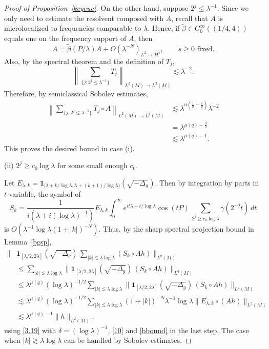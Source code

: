 \documentclass[11pt]{amsart}
\newcommand{\la}{\lambda}
\begin{document}
\begin{proof}[Proof of Proposition~\ref{keyeuc}]
On the other hand, suppose $2^j\leq\la^{-1}$. Since we only need
to estimate the resolvent composed with $A$, recall that $A$ is
microlocalized to frequencies comparable to $\la$. Hence, if
$\tilde\beta\in C_0^\infty((1/4,4))$ equals one on the frequency
support of $A$, then
\[
A=\tilde\beta(P/\la)A+O(\la^{-N})_{L^2\to H^s},\qquad s\geq0\text{ fixed}.
\]
Also, by the spectral theorem and the definition of $T_j$,
\[
\left\|
\sum_{\{j:2^j\leq\la^{-1}\}}T_j
\right\|_{L^2(M)\to L^2(M)}
\lesssim
\la^{-2}.
\]
Therefore, by semiclassical Sobolev estimates,
\begin{align*}
\left\|
\sum_{\{j:2^j\leq\la^{-1}\}}T_j\circ A
\right\|_{L^2(M)\to L^q(M)}
&\lesssim
\la^{n(\frac12-\frac1q)}
\la^{-2}
\\
&=
\la^{\mu(q)-\frac32}
\\
&\lesssim
\la^{\mu(q)-1}.
\end{align*}
This proves the desired bound in case (i).

\noindent(ii) $2^j\ge c_0\log\la$ for some small enough $c_0$.


Let
$E_{\la,k}=\mathbf{1}_{[\la+k/\log\la, \la +(k+1)/\log\la)}(\sqrt{-\Delta_g}).$ 
Then by integration by parts in $t$-variable, the symbol of 
$$S_k=\frac1{i(\la+i(\log\la)^{-1})}E_{\la,k}\int_0^\infty e^{it\la-t/\log\la}\cos (tP)\,\sum_{2^j\ge c_0\log\la}\gamma(2^{-j}t)\,dt
$$
is $O\left(\la^{-1}\log\la (1+|k|)^{-N}\right )$. Thus, by the sharp spectral projection bound in Lemma~\ref{bgsp},
\begin{align*}
\|&\mathbf{1}_{[\la/2,2\la]}( \sqrt{-\Delta_g}) \, 
 \sum_{|k|\lesssim \la\log\la}(
 S_k\circ A h)\|_{L^q( M)}
\\
&\le \sum_{|k|\lesssim \la\log\la}
\|\mathbf{1}_{[\la/2,2\la]}( \sqrt{-\Delta_g}) \,(S_k\circ A h)\|_{L^q( M)}
\\
&\le  \la^{\mu(q)}(\log\la)^{-1/2}  \sum_{|k|\lesssim \la\log\la}
\| \mathbf{1}_{[\la/2,2\la]}( \sqrt{-\Delta_g}) \, (S_k\circ A h)\|_{L^2( M)}
\\
&\lesssim \la^{\mu(q)}(\log\la)^{-1/2}\sum_{|k|\lesssim \la\log\la} (1+|k|)^{-N} \la^{-1}\log\la  \| E_{\la,k} \circ (A h)\|_{L^2( M)}
\\
&\lesssim \la^{\mu(q)-1}  \|h\|_{L^2( M)},
\end{align*}
 using \eqref{3.19} with $\delta=(\log\la)^{-1}$, \eqref{10} and \eqref{bbound} in the last step.
The case when $|k|\gtrsim \la\log\la$ can be handled by Sobolev estimates.







\end{proof}
\end{document}
